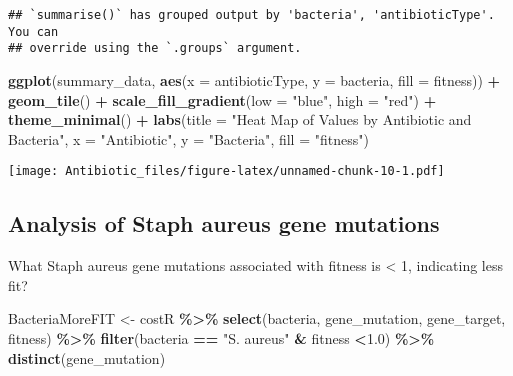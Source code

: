 \documentclass[
]{article}
\newenvironment{Shaded}{\begin{snugshade}}{\end{snugshade}}
\newcommand{\AttributeTok}[1]{\textcolor[rgb]{0.13,0.29,0.53}{#1}}
\newcommand{\FloatTok}[1]{\textcolor[rgb]{0.00,0.00,0.81}{#1}}
\newcommand{\FunctionTok}[1]{\textcolor[rgb]{0.13,0.29,0.53}{\textbf{#1}}}
\newcommand{\NormalTok}[1]{#1}
\newcommand{\OtherTok}[1]{\textcolor[rgb]{0.56,0.35,0.01}{#1}}
\newcommand{\SpecialCharTok}[1]{\textcolor[rgb]{0.81,0.36,0.00}{\textbf{#1}}}
\newcommand{\StringTok}[1]{\textcolor[rgb]{0.31,0.60,0.02}{#1}}
\begin{document}
\begin{verbatim}
## `summarise()` has grouped output by 'bacteria', 'antibioticType'. You can
## override using the `.groups` argument.
\end{verbatim}

\begin{Shaded}
\begin{Highlighting}[]
\FunctionTok{ggplot}\NormalTok{(summary\_data, }\FunctionTok{aes}\NormalTok{(}\AttributeTok{x =}\NormalTok{ antibioticType, }\AttributeTok{y =}\NormalTok{ bacteria, }\AttributeTok{fill =}\NormalTok{ fitness)) }\SpecialCharTok{+}
  \FunctionTok{geom\_tile}\NormalTok{() }\SpecialCharTok{+}
  \FunctionTok{scale\_fill\_gradient}\NormalTok{(}\AttributeTok{low =} \StringTok{"blue"}\NormalTok{, }\AttributeTok{high =} \StringTok{"red"}\NormalTok{) }\SpecialCharTok{+}
  \FunctionTok{theme\_minimal}\NormalTok{() }\SpecialCharTok{+}
  \FunctionTok{labs}\NormalTok{(}\AttributeTok{title =} \StringTok{"Heat Map of Values by Antibiotic and Bacteria"}\NormalTok{,}
       \AttributeTok{x =} \StringTok{"Antibiotic"}\NormalTok{,}
       \AttributeTok{y =} \StringTok{"Bacteria"}\NormalTok{,}
       \AttributeTok{fill =} \StringTok{"fitness"}\NormalTok{)}
\end{Highlighting}
\end{Shaded}

\texttt{[image: Antibiotic\_files/figure-latex/unnamed-chunk-10-1.pdf]}

\subsection{Analysis of Staph aureus gene
mutations}\label{analysis-of-staph-aureus-gene-mutations}

What Staph aureus gene mutations associated with fitness is \textless{}
1, indicating less fit?

\begin{Shaded}
\begin{Highlighting}[]
\NormalTok{BacteriaMoreFIT }\OtherTok{\textless{}{-}}\NormalTok{ costR }\SpecialCharTok{\%\textgreater{}\%} 
  \FunctionTok{select}\NormalTok{(bacteria, gene\_mutation, gene\_target, fitness) }\SpecialCharTok{\%\textgreater{}\%} 
  \FunctionTok{filter}\NormalTok{(bacteria }\SpecialCharTok{==} \StringTok{"S. aureus"} \SpecialCharTok{\&}\NormalTok{ fitness }\SpecialCharTok{\textless{}}\FloatTok{1.0}\NormalTok{) }\SpecialCharTok{\%\textgreater{}\%} 
  \FunctionTok{distinct}\NormalTok{(gene\_mutation)}
\end{Highlighting}
\end{Shaded}
\end{document}
